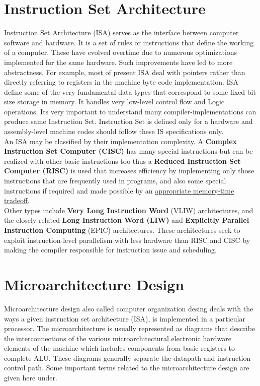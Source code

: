 \section{Instruction Set Architecture}
Instruction Set Architecture (ISA) serves as the interface between computer software and hardware. It is a set of rules or instructions that define the working of a computer. These have evolved overtime due to numerous optimizations implemented for the same hardware. Such improvements have led to more abstractness. For example, most of present ISA deal with pointers rather than directly referring to registers in the machine byte code implementation. ISA define some of the very fundamental data types that correspond to some fixed bit size storage in memory. It handles very low-level control flow and Logic operations. Its very important to understand many compiler-implementations can produce same Instruction Set. Instruction Set is defined only for a hardware and assembly-level machine codes should follow these IS specifications only. \\

An ISA may be classified by their implementation complexity. A \textbf{Complex Instruction Set Computer (CISC)} has many special instructions but can be realized with other basic instructions too thus a \textbf{Reduced Instruction Set Computer (RISC)} is used that increases efficiency by implementing only those instructions that are frequently used in programs, and also some special instructions if required and made possible by an \underline{appropriate memory-time tradeoff}.\\ 


Other types include \textbf{Very Long Instruction Word} (VLIW) architectures, and the closely related \textbf{Long Instruction Word (LIW)} and \textbf{Explicitly Parallel Instruction Computing} (EPIC) architectures. These architectures seek to exploit instruction-level parallelism with less hardware than RISC and CISC by making the compiler responsible for instruction issue and scheduling.\\

\section{Microarchitecture Design}

Microarchitecture design also called computer organization desing deals with the ways a given instruction set architecture (ISA), is implemented in a particular processor. The microarchitecture is usually represented as diagrams that describe the interconnections of the various microarchitectural electronic hardware elements of the machine which includes components from basic registers to complete ALU. These diagrams generally separate the datapath and instruction control path. Some important terms related to the microarchitecture design are given here under.\\

